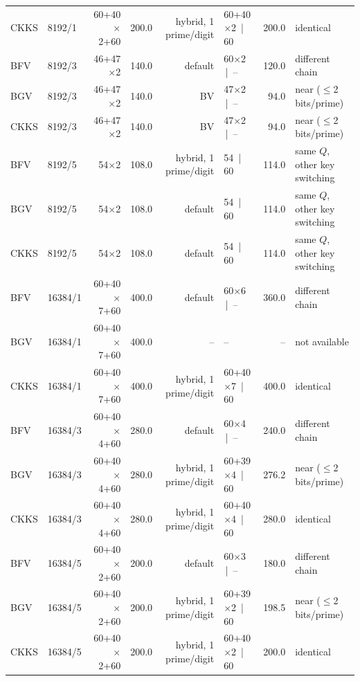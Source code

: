 \begin{longtable}{@{}llrlrlrl@{}}
CKKS & 8192/1 & 60+40$\times$2+60 & 200.0 & hybrid, 1 prime/digit & 60+40$\times$2 \,|\, 60 & 200.0 & identical \\
BFV & 8192/3 & 46+47$\times$2 & 140.0 & default & 60$\times$2 \,|\, -- & 120.0 & different chain \\
BGV & 8192/3 & 46+47$\times$2 & 140.0 & BV & 47$\times$2 \,|\, -- & 94.0 & near ($\le$2 bits/prime) \\
CKKS & 8192/3 & 46+47$\times$2 & 140.0 & BV & 47$\times$2 \,|\, -- & 94.0 & near ($\le$2 bits/prime) \\
BFV & 8192/5 & 54$\times$2 & 108.0 & hybrid, 1 prime/digit & 54 \,|\, 60 & 114.0 & same $Q$, other key switching \\
BGV & 8192/5 & 54$\times$2 & 108.0 & default & 54 \,|\, 60 & 114.0 & same $Q$, other key switching \\
CKKS & 8192/5 & 54$\times$2 & 108.0 & default & 54 \,|\, 60 & 114.0 & same $Q$, other key switching \\
BFV & 16384/1 & 60+40$\times$7+60 & 400.0 & default & 60$\times$6 \,|\, -- & 360.0 & different chain \\
BGV & 16384/1 & 60+40$\times$7+60 & 400.0 & -- & -- & -- & not available \\
CKKS & 16384/1 & 60+40$\times$7+60 & 400.0 & hybrid, 1 prime/digit & 60+40$\times$7 \,|\, 60 & 400.0 & identical \\
BFV & 16384/3 & 60+40$\times$4+60 & 280.0 & default & 60$\times$4 \,|\, -- & 240.0 & different chain \\
BGV & 16384/3 & 60+40$\times$4+60 & 280.0 & hybrid, 1 prime/digit & 60+39$\times$4 \,|\, 60 & 276.2 & near ($\le$2 bits/prime) \\
CKKS & 16384/3 & 60+40$\times$4+60 & 280.0 & hybrid, 1 prime/digit & 60+40$\times$4 \,|\, 60 & 280.0 & identical \\
BFV & 16384/5 & 60+40$\times$2+60 & 200.0 & default & 60$\times$3 \,|\, -- & 180.0 & different chain \\
BGV & 16384/5 & 60+40$\times$2+60 & 200.0 & hybrid, 1 prime/digit & 60+39$\times$2 \,|\, 60 & 198.5 & near ($\le$2 bits/prime) \\
CKKS & 16384/5 & 60+40$\times$2+60 & 200.0 & hybrid, 1 prime/digit & 60+40$\times$2 \,|\, 60 & 200.0 & identical \\
\bottomrule
\end{longtable}
